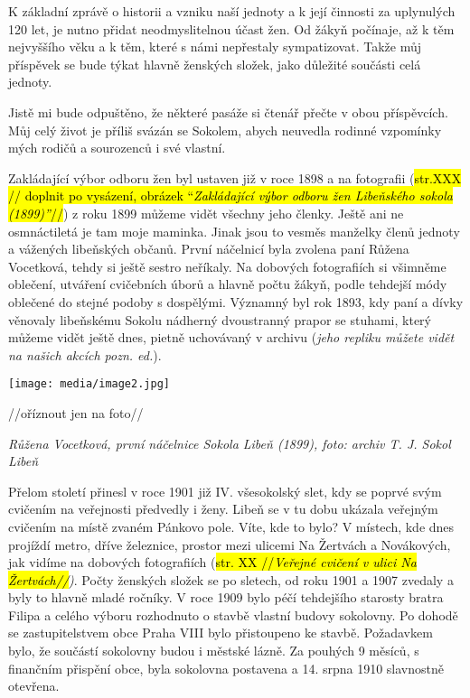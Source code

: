 K základní zprávě o historii a vzniku naší jednoty a k její činnosti za
uplynulých 120 let, je nutno přidat neodmyslitelnou účast žen. Od žákyň
počínaje, až k těm nejvyššího věku a k těm, které s námi nepřestaly
sympatizovat. Takže můj příspěvek se bude týkat hlavně ženských složek,
jako důležité součásti celá jednoty.

Jistě mi bude odpuštěno, že některé pasáže si čtenář přečte v obou
příspěvcích. Můj celý život je příliš svázán se Sokolem, abych neuvedla
rodinné vzpomínky mých rodičů a sourozenců i své vlastní.

Zakládající výbor odboru žen byl ustaven již v roce 1898 a na fotografii
(\hl{str.XXX // doplnit po vysázení, obrázek ``\emph{Zakládající výbor
odboru žen Libeňského sokola (1899)''}//}) z roku 1899 můžeme vidět
všechny jeho členky. Ještě ani ne osmnáctiletá je tam moje maminka.
Jinak jsou to vesměs manželky členů jednoty a vážených libeňských
občanů. První náčelnicí byla zvolena paní Růžena Vocetková, tehdy si
ještě sestro neříkaly. Na dobových fotografiích si všimněme oblečení,
utváření cvičebních úborů a hlavně počtu žákyň, podle tehdejší módy
oblečené do stejné podoby s dospělými. Významný byl rok 1893, kdy paní a
dívky věnovaly libeňskému Sokolu nádherný dvoustranný prapor se stuhami,
který můžeme vidět ještě dnes, pietně uchovávaný v archivu (\emph{jeho
repliku můžete vidět na našich akcích pozn. ed.}).

\texttt{[image: media/image2.jpg]}

//oříznout jen na foto//

\emph{Růžena Vocetková, první náčelnice Sokola Libeň (1899), foto:
archiv T. J. Sokol Libeň}

Přelom století přinesl v roce 1901 již IV. všesokolský slet, kdy se
poprvé svým cvičením na veřejnosti předvedly i ženy. Libeň se v tu dobu
ukázala veřejným cvičením na místě zvaném Pánkovo pole. Víte, kde to
bylo? V místech, kde dnes projíždí metro, dříve železnice, prostor mezi
ulicemi Na Žertvách a Novákových, jak vidíme na dobových fotografiích
(\hl{str. XX //\emph{Veřejné cvičení v ulici Na Žertvách//}}\emph{)}.
Počty ženských složek se po sletech, od roku 1901 a 1907 zvedaly a byly
to hlavně mladé ročníky. V roce 1909 bylo péčí tehdejšího starosty
bratra Filipa a celého výboru rozhodnuto o stavbě vlastní budovy
sokolovny. Po dohodě se zastupitelstvem obce Praha VIII bylo přistoupeno
ke stavbě. Požadavkem bylo, že součástí sokolovny budou i městské lázně.
Za pouhých 9 měsíců, s finančním přispění obce, byla sokolovna postavena
a 14. srpna 1910 slavnostně otevřena.

